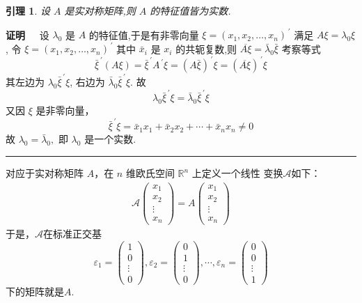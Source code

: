 \documentclass[13pt]{beamer}
\newtheorem{lem}{引理}
\def\qed{\nopagebreak\hfill{\rule{4pt}{7pt}}\medbreak}
\def\pf{{\bf 证明~~ }}
\def\Rn{\mathbb{R}^n}
\begin{document}
\begin{frame}

\begin{lem}
设 $A$ 是实对称矩阵,则 $A$ 的特征值皆为实数. 
\end{lem}
\pf  设 $\lambda_{0}$ 是 ${A}$ 的特征值,于是有非零向量
$\xi=\left(x_{1}, x_{2}, \ldots, x_{n}\right)^{\, \prime}$
满足
${A} {\xi}=\lambda_{0} {\xi}$, 
令
$\xi = \left( {x}_{1}, {x}_{2}, \ldots, {x}_{n} \right)^{\, \prime}$
其中 $\bar{x}_{i}$ 是 $x_{i}$ 的共轭复数,则 $\overline{A \xi}=\bar{\lambda}_{0} \bar{\xi}$
考察等式
\[
\bar{\xi}^{\, \prime}(A \xi)=\bar{\xi}^{\, \prime} A^{\, \prime} \xi=(A \bar{\xi})^{\, \prime} \xi=(\overline{A \xi})^{\, \prime} \xi
\]
其左边为 $\lambda_{0} \bar{\xi}^{\, \prime} \xi$, 右边为 $\bar{\lambda}_{0} \bar{\xi}^{\, \prime} \xi$. 故
\[
\lambda_{0} \bar{\xi}^{\, \prime} \xi = \bar{\lambda}_{0} \bar{\xi}^{\, \prime} \xi
\]
又因 $\xi$ 是非零向量，
\[
\bar{\xi}^{\, \prime} \xi=\bar{x}_{1} x_{1}+\bar{x}_{2} x_{2}+\cdots+\bar{x}_{n} x_{n} \neq 0
\]
故 $\lambda_{0}=\bar{\lambda}_{0},$ 即 $\lambda_{0}$ 是一个实数. 
\qed
\end{frame}


\begin{frame}

对应于实对称矩阵 $A$，在 $n$ 维欧氏空间 $\Rn$ 上定义一个线性 变换$\mathscr{A}$如下：
\begin{align}\label{eq-1}
\mathscr{A}\left(\begin{array}{c}
x_{1} \\
x_{2} \\
\vdots \\
x_{n}
\end{array}\right)={A}\left(\begin{array}{c}
x_{1} \\
x_{2} \\
\vdots \\
x_{n}
\end{array}\right)
\end{align}
于是，$\mathscr{A}$在标准正交基
\[
{\varepsilon}_{1}=\left(\begin{array}{c}
1 \\
0 \\
\vdots \\
0
\end{array}\right), {\varepsilon}_{2}=\left(\begin{array}{c}
0 \\
1 \\
\vdots \\
0
\end{array}\right), \cdots, {\varepsilon}_{n}=\left(\begin{array}{c}
0 \\
0 \\
\vdots \\
1
\end{array}\right)
\]
下的矩阵就是$A$. 
\end{frame}
\end{document}
